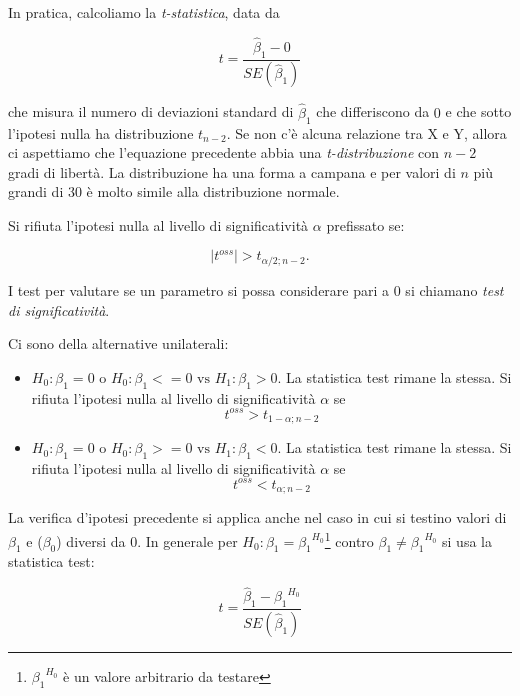 In pratica, calcoliamo la \textit{t-statistica}, data da

\begin{equation}
t = \frac{{\hat{\beta}}_1 - 0}{SE({\hat{\beta}}_1)}
\end{equation}

che misura il numero di deviazioni standard di ${\hat{\beta}}_1$ che differiscono da $0$ e che sotto l'ipotesi nulla ha distribuzione $t_{n-2}$. Se non c'è alcuna relazione tra X e Y, allora ci aspettiamo che l'equazione precedente abbia una \textit{t-distribuzione} con $n - 2$ gradi di libertà. La distribuzione ha una forma a campana e per valori di $n$ più grandi di 30 è molto simile alla distribuzione normale.

Si rifiuta l'ipotesi nulla al livello di significatività $\alpha$ prefissato se:

\begin{equation}
|t^{oss}| > t_{{\alpha}/2;n-2}.
\end{equation}

I test per valutare se un parametro si possa considerare pari a 0 si chiamano \textit{test di significatività}.

Ci sono della alternative unilaterali:

\begin{itemize}
\item $H_{0}: {\beta}_1 = 0 \text{ o } H_{0}: {\beta}_1 <= 0 \text{ vs } H_{1}:{\beta}_1 > 0$. La statistica test rimane la stessa. Si rifiuta l'ipotesi nulla al livello di significatività $\alpha$ se
\begin{equation}
t^{oss} > t_{1-\alpha;n-2}
\end{equation}
\item $H_{0}: {\beta}_1 = 0 \text{ o } H_{0}: {\beta}_1 >= 0 \text{ vs } H_{1}:{\beta}_1 < 0$. La statistica test rimane la stessa. Si rifiuta l'ipotesi nulla al livello di significatività $\alpha$ se
\begin{equation}
t^{oss} < t_{\alpha;n-2}
\end{equation}
\end{itemize}

La verifica d'ipotesi precedente si applica anche nel caso in cui si testino valori di ${\beta}_1$ e (${\beta}_0$) diversi da 0. In generale per $H_0: {\beta}_1 = {{\beta}_1}^{H_0}$\footnote{${{\beta}_1}^{H_0}$ è un valore arbitrario da testare} contro ${\beta}_1 \neq {{\beta}_1}^{H_0}$ si usa la statistica test:

\begin{equation}
t = \frac{{\hat{\beta}}_1 - {{\beta}_1}^{H_0}}{SE({\hat{\beta}}_1)}
\end{equation}

